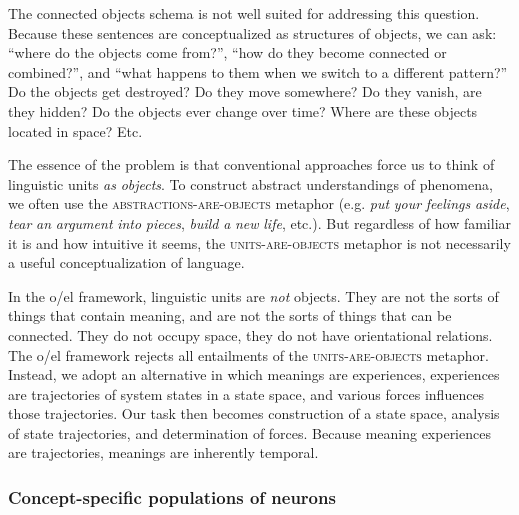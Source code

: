   The connected objects schema is not well suited for addressing this question. Because these sentences are conceptualized as structures of objects, we can ask: “where do the objects come from?”, “how do they become connected or combined?”, and “what happens to them when we switch to a different pattern?” Do the objects get destroyed? Do they move somewhere? Do they vanish, are they hidden? Do the objects ever change over time? Where are these objects located in space? Etc.

  The essence of the problem is that conventional approaches force us to think of linguistic units \textit{as} \textit{objects}. To construct abstract understandings of phenomena, we often use the \textsc{abstractions-}\textsc{are}\textsc{{}-objects} metaphor (e.g. \textit{put} \textit{your} \textit{feelings} \textit{aside}, \textit{tear} \textit{an} \textit{argument} \textit{into} \textit{pieces}, \textit{build} \textit{a} \textit{new} \textit{life}, etc.). But regardless of how familiar it is and how intuitive it seems, the \textsc{units}\textsc{{}-are-}\textsc{objects} metaphor is not necessarily a useful conceptualization of language. 

  In the o/el framework, linguistic units are \textit{not} objects. They are not the sorts of things that contain meaning, and are not the sorts of things that can be connected. They do not occupy space, they do not have orientational relations. The o/el framework rejects all entailments of the \textsc{units}\textsc{{}-are-}\textsc{objects} metaphor. Instead, we adopt an alternative in which meanings are experiences, experiences are trajectories of system states in a state space, and various forces influences those trajectories. Our task then becomes construction of a state space, analysis of state trajectories, and determination of forces. Because meaning experiences are trajectories, meanings are inherently temporal. 

\subsubsection{Concept-specific populations of neurons}

